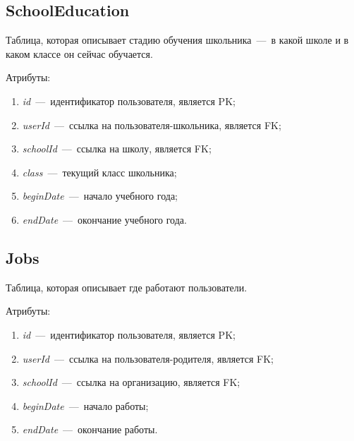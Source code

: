 \documentclass[14pt]{article}
\begin{document}
\subsection{SchoolEducation}

Таблица, которая описывает стадию обучения школьника~---~в какой школе и в каком классе он сейчас обучается.

Атрибуты:
\begin{enumerate}
	\item \emph{id}~---~идентификатор пользователя, является PK; 
	\item \emph{userId}~---~ссылка на пользователя-школьника, является FK;
	\item \emph{schoolId}~---~ссылка на школу, является FK;
	\item \emph{class}~---~текущий класс школьника;
	\item \emph{beginDate}~---~начало учебного года;
	\item \emph{endDate}~---~окончание учебного года.
\end{enumerate}

\subsection{Jobs}

Таблица, которая описывает где работают пользователи.

Атрибуты:
\begin{enumerate}
	\item \emph{id}~---~идентификатор пользователя, является PK; 
	\item \emph{userId}~---~ссылка на пользователя-родителя, является FK;
	\item \emph{schoolId}~---~ссылка на организацию, является FK;
	\item \emph{beginDate}~---~начало работы;
	\item \emph{endDate}~---~окончание работы.
\end{enumerate}
\end{document}
